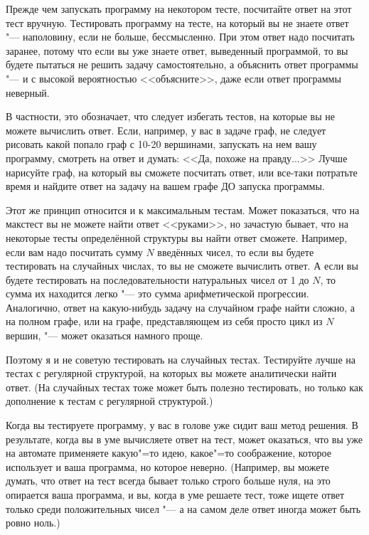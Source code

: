 \documentclass[a4paper,10pt]{problems}
\begin{document}
 Прежде чем запускать программу на некотором тесте, посчитайте ответ на этот тест вручную. 
Тестировать программу на тесте, на который вы не знаете ответ "--- наполовину, если не больше, бессмысленно.
При этом ответ надо посчитать заранее, потому что если вы уже знаете ответ, выведенный программой, 
то вы будете пытаться не решить задачу самостоятельно, а объяснить ответ программы "--- и с высокой вероятностью <<объясните>>, 
даже если ответ программы неверный.

В частности, это обозначает, что следует избегать тестов, на которые вы не можете вычислить ответ. 
Если, например, у вас в задаче граф, не следует рисовать какой попало граф с 10-20 вершинами, запускать на нем вашу программу, смотреть на ответ и думать:
<<Да, похоже на правду...>> Лучше нарисуйте граф, на который вы сможете посчитать ответ, или все-таки потратьте время и найдите ответ на задачу 
на вашем графе ДО запуска программы.

Этот же принцип относится и к максимальным тестам. Может показаться, что на макстест вы не можете найти ответ <<руками>>, но зачастую бывает,
что на некоторые тесты определённой структуры вы найти ответ сможете. 
Например, если вам надо посчитать сумму $N$ введённых чисел, то если вы будете тестировать на случайных числах, то вы не сможете вычислить ответ. 
А если вы будете тестировать на последовательности натуральных чисел от 1 до $N$, то сумма их находится легко "--- это сумма арифметической прогрессии.
Аналогично, ответ на какую-нибудь задачу на случайном графе найти сложно, а на полном графе, или на графе, представляющем из себя просто цикл из $N$ вершин,
"--- может оказаться намного проще.

Поэтому я и не советую тестировать на случайных тестах. 
Тестируйте лучше на тестах с регулярной структурой, на которых вы можете аналитически найти ответ.
(На случайных тестах тоже может быть полезно тестировать, но только как дополнение к тестам с регулярной структурой.)

Когда вы тестируете программу, у вас в голове уже сидит ваш метод решения. В результате, когда вы в уме вычисляете ответ на тест,
может оказаться, что вы уже на автомате применяете какую"=то идею, какое"=то соображение, которое использует и ваша программа,
но которое неверно. 
(Например, вы можете думать, что ответ на тест всегда бывает только строго больше нуля, на это опирается ваша программа, 
и вы, когда в уме решаете тест, тоже ищете ответ только среди положительных чисел "--- а на самом деле ответ иногда может быть ровно ноль.)
\end{document}
